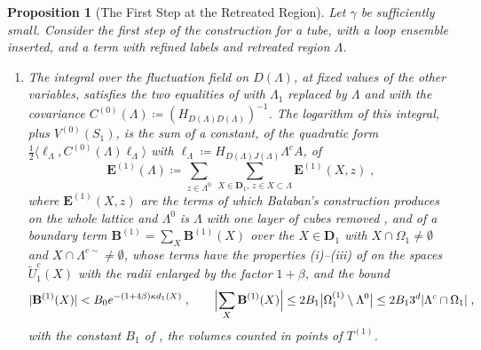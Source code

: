 \documentclass[11pt]{preprint}
\DeclarePairedDelimiter{\abs}{\lvert}{\rvert}
\numberwithin{equation}{section}
\newtheorem{proposition}{Proposition}
\theoremstyle{definition}
\theoremstyle{remark}
\theoremstyle{plain}
\begin{document}
\begin{proposition}[The First Step at the Retreated Region]\label{prop:retreated-first-step}
Let $\gamma$ be sufficiently small. Consider the first step of the construction for a tube, with a loop ensemble inserted, and a term with refined labels and retreated region $\Lambda$.
\begin{enumerate}[label=(\roman*)]
\item The integral over the fluctuation field on $D(\Lambda)$, at fixed values of the other variables, satisfies the two equalities of \cite[(1.26), p.~253]{BalabanCRE} with $\Lambda_1$ replaced by $\Lambda$ and with the covariance $C^{(0)}(\Lambda) \coloneqq (H_{D(\Lambda)D(\Lambda)})^{-1}$. The logarithm of this integral, plus $V^{(0)}(S_1)$, is the sum of a constant, of the quadratic form $\frac12\langle\ell_\Lambda, C^{(0)}(\Lambda)\ell_\Lambda\rangle$ with $\ell_\Lambda \coloneqq H_{D(\Lambda)J(\Lambda)}\Lambda^cA$, of
\begin{equation}\label{eq:retreated-interior}
    \mathbf E^{(1)}(\Lambda) \coloneqq \sum_{z \in \Lambda^0}\,\sum_{X \in \mathbf D_1,\, z \in X \subset \Lambda}\mathbf E^{(1)}(X, z)\;,
\end{equation}
where $\mathbf E^{(1)}(X, z)$ are the terms of \cite[(2.26)--(2.27), p.~259]{BalabanCRE} which Ba{\l}aban's construction produces on the whole lattice and $\Lambda^0$ is $\Lambda$ with one layer of cubes removed \cite[p.~259]{BalabanCRE}, and of a boundary term $\mathbf B^{(1)} = \sum_X\mathbf B^{(1)}(X)$ over the $X \in \mathbf D_1$ with $X \cap \Omega_1 \neq \emptyset$ and $X \cap \Lambda^{c\sim} \neq \emptyset$, whose terms have the properties (i)--(iii) of \cite[p.~261]{BalabanCRE} on the spaces $\tilde U^c_1(X)$ with the radii enlarged by the factor $1 + \beta$, and the bound
\begin{equation}\label{eq:retreated-boundary-bound}
    \abs{\mathbf B^{(1)}(X)} < B_0e^{-(1 + 4\beta)\kappa d_1(X)}\;,
    \qquad
    \Bigl\lvert\sum_X\mathbf B^{(1)}(X)\Bigr\rvert \leq 2B_1\bigl\lvert\Omega_1^{(1)} \setminus \Lambda^0\bigr\rvert \leq 2B_13^d\abs{\Lambda^c \cap \Omega_1}\;,
\end{equation}
with the constant $B_1$ of \cite[(2.47), p.~264]{BalabanCRE}, the volumes counted in points of $T^{(1)}$.

\end{enumerate}
\end{proposition}
\end{document}
